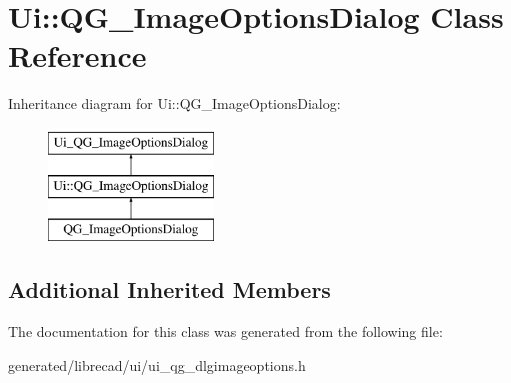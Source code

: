 \hypertarget{classUi_1_1QG__ImageOptionsDialog}{\section{Ui\-:\-:Q\-G\-\_\-\-Image\-Options\-Dialog Class Reference}
\label{classUi_1_1QG__ImageOptionsDialog}
}
Inheritance diagram for Ui\-:\-:Q\-G\-\_\-\-Image\-Options\-Dialog\-:\begin{figure}[H]
\begin{center}
\leavevmode
\includegraphics[height=3.000000cm]{classUi_1_1QG__ImageOptionsDialog}
\end{center}
\end{figure}
\subsection*{Additional Inherited Members}


The documentation for this class was generated from the following file\-:\begin{DoxyCompactItemize}
\item 
generated/librecad/ui/ui\-\_\-qg\-\_\-dlgimageoptions.\-h\end{DoxyCompactItemize}

